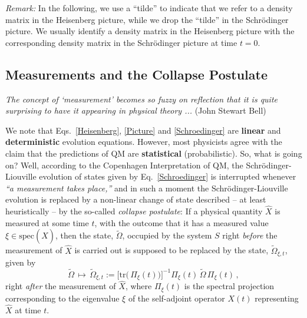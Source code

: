 \documentclass[12pt]{article}
\begin{document}
\textit{Remark:} In the following, we use a ``tilde'' to indicate that we refer to a density matrix in the Heisenberg picture, while we drop the ``tilde'' in the Schr\"odinger picture. We usually identify a density matrix in the Heisenberg picture with the corresponding density matrix in the Schr\"odinger picture at time $t=0$.

\subsection{Measurements and the Collapse Postulate}

\hspace{0.5cm}\textit{The concept of `measurement' becomes so fuzzy on reflection that it is quite surprising to have it appearing in physical theory ...} (John Stewart Bell)

We note that Eqs.~\eqref{Heisenberg}, \eqref{Picture} and \eqref{Schroedinger} are {\bf{linear}} and {\bf{deterministic}} 
evolution equations.
However, most physicists agree with the claim that the predictions of QM are {\bf{statistical}} (probabilistic). So, what is 
going on? Well, according to the Copenhagen Interpretation of QM, the Schr\"odinger-Liouville evolution of states given 
by Eq.~\eqref{Schroedinger} is interrupted whenever  \textit{``a measurement takes place,''} and in such a moment 
the Schr\"odinger-Liouville evolution is replaced by a non-linear change of state described -- at least heuristically  -- 
by the so-called \textit{collapse postulate}: If a physical quantity $\hat{X}$ is measured at some time $t$, with the outcome
 that it has a measured value $\xi \in \text{spec}(\hat{X})$, then the state, $\widetilde{\Omega}$, occupied by the system 
 $S$ right \textit{before} the measurement of $\hat{X}$ is carried out is supposed to be replaced by the state, 
 $\widetilde{\Omega}_{\xi, t}$, given by
\begin{equation}\label{collapse}
\widetilde{\Omega} \,\mapsto\,  \widetilde{\Omega}_{\xi, t} := \big[\text{tr}\big(\,\Pi_{\xi}(t)\big)\big]^{-1} \Pi_{\xi}(t)\, 
\widetilde{\Omega}\, \Pi_{\xi}(t)\,,
\end{equation}
right \textit{after} the measurement of $\hat{X}$, where $\Pi_{\xi}(t)$ is the spectral projection corresponding to the eigenvalue $\xi$ of the self-adjoint operator $X(t)$ representing $\hat{X}$ at time $t$. 
\end{document}
